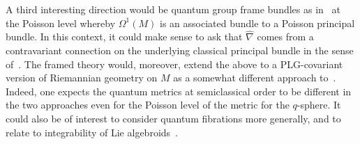\documentclass[10pt,a4paper]{amsart}
\numberwithin{equation}{section}
\newcommand{\<}{{\langle}}
\renewcommand{\>}{{\rangle}}
\begin{document}
 A third interesting direction would be quantum group frame bundles as in~\cite{Ma:non} at the Poisson level whereby $\Omega^1(M)$ is an associated bundle to a Poisson principal bundle. In this context, it could make sense to ask that $\hat\nabla$ comes from a contravariant connection on the underlying classical principal bundle in the sense of~\cite{Fer}. The framed theory would, moreover, extend the above to a PLG-covariant version of Riemannian geometry on $M$ as a somewhat different approach to~\cite{BegMa:prg}. Indeed, one expects the quantum metrics at semiclassical order to be different in the two approaches even for the Poisson level of the metric for the $q$-sphere. It could also be of interest to consider quantum fibrations more generally, and to relate to integrability of Lie algebroids~\cite{CraFer}.

\vspace{-2mm}

\end{document}

